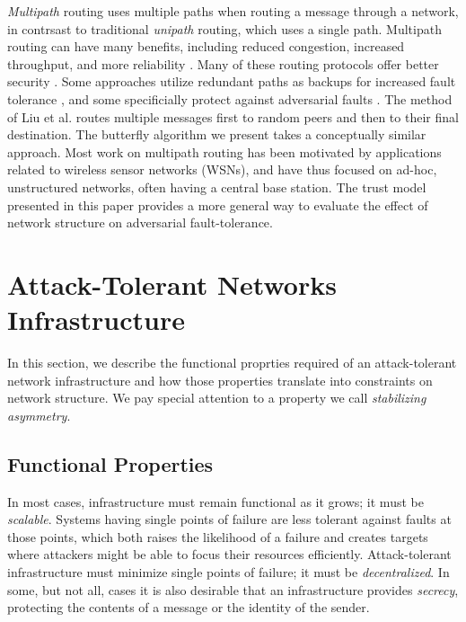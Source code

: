 \documentclass[prodmode,permissions]{acmsmall-ec16}
\begin{document}
{\em Multipath} routing uses multiple paths when routing a message through a
network, in contrsast to traditional {\em unipath} routing, which uses
a single path.
Multipath routing can have many benefits, including reduced congestion,
increased throughput, and more reliability
\cite{qadir_exploiting_2015}.
Many of these routing protocols offer better security 
\cite{zin_survey_2015}.
Some approaches utilize redundant paths as backups for increased
fault tolerance
\cite{alrajeh_secure_2013},
and some specificially protect against adversarial faults
\cite{kohno_improvement_2012, khalil_unmask:_2010, lou_h-spread:_2006}.
The method of Liu et al.
\cite{liu_secure_2012}
routes multiple messages first to random peers and then
to their final destination.
The butterfly algorithm we present takes a conceptually similar approach.
Most work on multipath routing has been motivated by applications related to
wireless sensor networks (WSNs),
and have thus focused on ad-hoc, unstructured networks, often having a central
base station.
The trust model presented in this paper provides a more general way to evaluate
the effect of network structure on adversarial fault-tolerance.

\section{Attack-Tolerant Networks Infrastructure}

In this section, we describe the functional proprties required of an
attack-tolerant network infrastructure and how those properties translate
into constraints on network structure.
We pay special attention to a property we call
{\em stabilizing asymmetry}.

\subsection{Functional Properties}

In most cases, infrastructure must remain functional as it grows;
it must be {\em scalable}.
Systems having single points of failure are less tolerant against faults at those
points, which both raises the likelihood of a failure and creates targets
where attackers might be able to focus their resources efficiently.
Attack-tolerant infrastructure must minimize single points of failure;
it must be {\em decentralized}.
In some, but not all, cases it is also desirable that an infrastructure
provides {\em secrecy},
protecting the contents of a message or the identity of the sender.
\end{document}
